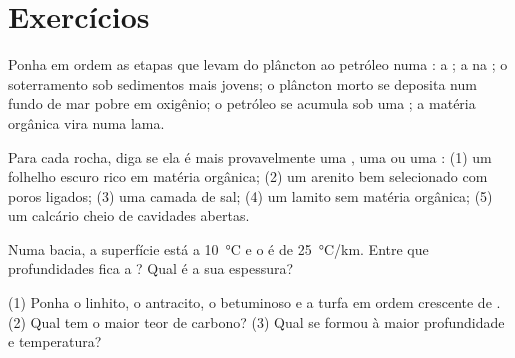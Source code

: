 \section{Exercícios}

\begin{exercise}[$\star$]\label{exo:g11:fossil-fuel-geology:1}
Ponha em ordem as etapas que levam do plâncton ao petróleo numa : a
; a  na ; o soterramento sob sedimentos
mais jovens; o plâncton morto se deposita num fundo de mar pobre em
oxigênio; o petróleo se acumula sob uma ; a matéria orgânica
vira  numa lama.
\end{exercise}

\begin{exercise}[$\star$]\label{exo:g11:fossil-fuel-geology:2}
Para cada rocha, diga se ela é mais provavelmente uma , uma
 ou uma : (1) um folhelho escuro rico em
matéria orgânica; (2) um arenito bem selecionado com poros ligados; (3) uma
camada de sal; (4) um lamito sem matéria orgânica; (5) um calcário cheio de
cavidades abertas.
\end{exercise}

\begin{exercise}[$\star$]\label{exo:g11:fossil-fuel-geology:3}
Numa bacia, a superfície está a \qty{10}{\degreeCelsius} e o  é de \qty{25}{\degreeCelsius/km}. Entre que profundidades fica a
? Qual é a sua espessura?
\end{exercise}

\begin{exercise}[$\star$]\label{exo:g11:fossil-fuel-geology:4}
(1) Ponha o linhito, o antracito, o  betuminoso e a turfa em ordem
crescente de . (2) Qual tem o maior teor de carbono?
(3) Qual se formou à maior profundidade e temperatura?
\end{exercise}

